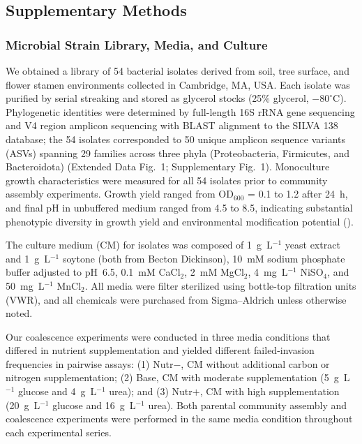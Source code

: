 \subsection*{Supplementary Methods}
\label{sec:suppl:methods}

\subsubsection*{Microbial Strain Library, Media, and Culture}
\label{sec:suppl:strains}

We obtained a library of 54 bacterial isolates derived from soil, tree surface, and flower stamen environments collected in Cambridge, MA, USA. Each isolate was purified by serial streaking and stored as glycerol stocks (25\% glycerol, $-80^\circ$C). Phylogenetic identities were determined by full-length 16S rRNA gene sequencing and V4 region amplicon sequencing with BLAST alignment to the SILVA 138 database; the 54 isolates corresponded to 50 unique amplicon sequence variants (ASVs) spanning 29 families across three phyla (Proteobacteria, Firmicutes, and Bacteroidota) (Extended Data Fig.~1; Supplementary Fig.~1). Monoculture growth characteristics were measured for all 54 isolates prior to community assembly experiments. Growth yield ranged from OD$_{600}$ = 0.1 to 1.2 after 24~h, and final pH in unbuffered medium ranged from 4.5 to 8.5, indicating substantial phenotypic diversity in growth yield and environmental modification potential ().

The culture medium (CM) for isolates was composed of 1~g~L$^{-1}$ yeast extract and 1~g~L$^{-1}$ soytone (both from Becton Dickinson), 10~mM sodium phosphate buffer adjusted to pH~6.5, 0.1~mM CaCl$_2$, 2~mM MgCl$_2$, 4~mg~L$^{-1}$ NiSO$_4$, and 50~mg~L$^{-1}$ MnCl$_2$. All media were filter sterilized using bottle-top filtration units (VWR), and all chemicals were purchased from Sigma--Aldrich unless otherwise noted.

Our coalescence experiments were conducted in three media conditions that differed in nutrient supplementation and yielded different failed-invasion frequencies in pairwise assays: (1) Nutr$-$, CM without additional carbon or nitrogen supplementation; (2) Base, CM with moderate supplementation (5~g~L$^{-1}$ glucose and 4~g~L$^{-1}$ urea); and (3) Nutr$+$, CM with high supplementation (20~g~L$^{-1}$ glucose and 16~g~L$^{-1}$ urea). Both parental community assembly and coalescence experiments were performed in the same media condition throughout each experimental series.


